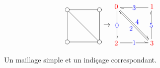 \documentclass[]{article}
\begin{document}
\begin{multicols}{2}
	\begin{figure}[H]
		\[\begin{aligned}[c]
		\entrymodifiers={+[o][F]}
		\renewcommand{\labelstyle}{\textstyle}
		\xymatrix@=4em @L=.25ex{
			{}
			\ar @^{-} [d]
			\ar @^{-} [dr]
			& {}
			\ar @^{-} [l]
			\\ {}
			\ar @^{-} [r]
			& {}
			\ar @^{-} [u]
		}
		\end{aligned}\rightarrow\begin{aligned}[c]
		\xymatrix@=4em @L=.25ex{
			{\color{red}0}
			\ar @<.25ex> @^{->} [d] |{\color{blue}0}
			\ar @<.25ex> @^{->} [dr] ^{\color{blue}4}
			& {\color{red}1}
			\ar @<.25ex> @^{->} [l] |{\color{blue}3}
			\\ {\color{red}2}
			\ar @<.25ex> @^{->} [r] |{\color{blue}1}
			& {\color{red}3}
			\ar @<.25ex> @^{->} [ul] ^{\color{blue}2}
			\ar @<.25ex> @^{->} [u] |{\color{blue}5}
		}
		\end{aligned}\]
		\caption{Un maillage simple et un indiçage correspondant.}
		\label{maillage_simple}
	\end{figure}


\end{multicols}
\end{document}
